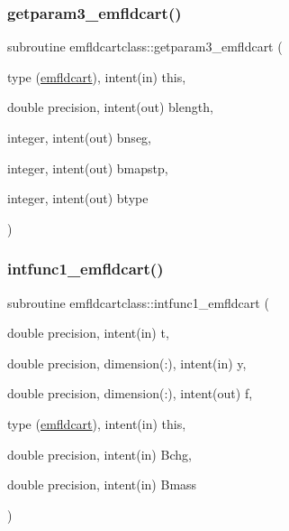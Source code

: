 \mbox{\label{namespaceemfldcartclass_af5ef093e045d499ae731aad8612e6333}} 
\subsubsection{\texorpdfstring{getparam3\_emfldcart()}{getparam3\_emfldcart()}}
{\footnotesize\ttfamily subroutine emfldcartclass\+::getparam3\+\_\+emfldcart (\begin{DoxyParamCaption}\item[{type (\mbox{\hyperlink{namespaceemfldcartclass_structemfldcartclass_1_1emfldcart}{emfldcart}}), intent(in)}]{this,  }\item[{double precision, intent(out)}]{blength,  }\item[{integer, intent(out)}]{bnseg,  }\item[{integer, intent(out)}]{bmapstp,  }\item[{integer, intent(out)}]{btype }\end{DoxyParamCaption})}

\mbox{\label{namespaceemfldcartclass_a2a33c1d59a306651080d563b98b844e7}} 
\subsubsection{\texorpdfstring{intfunc1\_emfldcart()}{intfunc1\_emfldcart()}}
{\footnotesize\ttfamily subroutine emfldcartclass\+::intfunc1\+\_\+emfldcart (\begin{DoxyParamCaption}\item[{double precision, intent(in)}]{t,  }\item[{double precision, dimension(\+:), intent(in)}]{y,  }\item[{double precision, dimension(\+:), intent(out)}]{f,  }\item[{type (\mbox{\hyperlink{namespaceemfldcartclass_structemfldcartclass_1_1emfldcart}{emfldcart}}), intent(in)}]{this,  }\item[{double precision, intent(in)}]{Bchg,  }\item[{double precision, intent(in)}]{Bmass }\end{DoxyParamCaption})}


